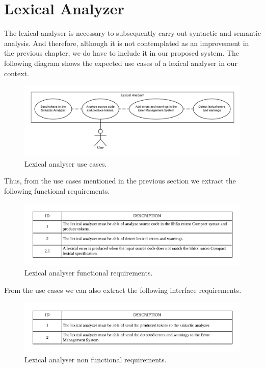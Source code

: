 \section{Lexical Analyzer}
The lexical analyser is necessary to subsequently carry out syntactic and semantic analysis.
And therefore, although it is not contemplated as an improvement in
the previous chapter, we do have to include it in our proposed system. The following diagram
shows the expected use cases of a lexical analyser in our context.

\begin{figure}[h!]
    \includegraphics[scale=0.6]{images/lex-use-case.pdf}
    \centering
    \caption[Lexical analyser use cases]{Lexical analyser use cases.}
    \label{fig:lex-use-case}
\end{figure}

Thus, from the use cases mentioned in the previous section we
extract the following functional requirements.

\begin{figure}[h!]
    \includegraphics[width=\textwidth]{images/lex-reqf.pdf}
    \centering
    \caption[Lexical analyser functional requirements]{Lexical analyser functional requirements.}
    \label{fig:lex-reqf}
\end{figure}

From the use cases we can also extract the following interface requirements.

\begin{figure}[h!]
    \includegraphics[width=\textwidth]{images/lex-reqnf.pdf}
    \centering
    \caption[Lexical analyser non functional requirements]{Lexical analyser non functional requirements.}
    \label{fig:lex-reqnf}
\end{figure}

